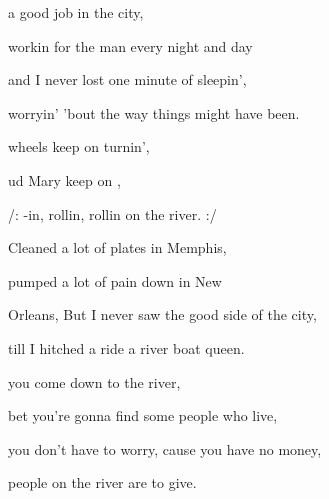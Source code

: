 


\zs
{} a good job in the city,

workin for the man every night and day

and I never lost one minute of sleepin',

worryin' 'bout the way things might have been.
\ks

\zr
{} wheels keep on turnin',

ud  Mary keep on ,

/: -in, rollin, rollin on the river. :/
\kr

\zs
{Cleaned} a lot of plates in Memphis,

pumped a lot of pain down in New

Orleans,  But I never saw the good side of the city,

till I hitched a ride  a river boat queen.
\ks

\zr
\kr

\zs
{} you come down to the river,

bet you're gonna find some people who live,

you don't have to worry, cause you have no money,

people on the river are  to give.
\ks

\zr\kr

\kp



